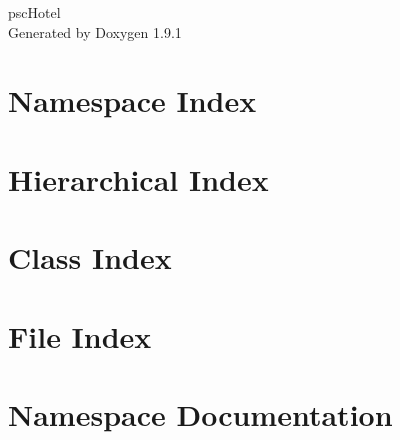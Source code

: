\let\mypdfximage\pdfximage\def\pdfximage{\immediate\mypdfximage}\documentclass[twoside]{book}
\newcommand{\+}{\discretionary{\mbox{\scriptsize$\hookleftarrow$}}{}{}}
\newcommand{\clearemptydoublepage}{%
  \newpage{\pagestyle{empty}\cleardoublepage}%
}
\begin{document}
\raggedbottom

\hypersetup{pageanchor=false,
             bookmarksnumbered=true,
             pdfencoding=unicode
            }
\begin{titlepage}
\vspace*{7cm}
\begin{center}%
{\Large psc\+Hotel }\\
\vspace*{1cm}
{\large Generated by Doxygen 1.9.1}\\
\end{center}
\end{titlepage}
\clearemptydoublepage
{}
\tableofcontents
\clearemptydoublepage
{}
\hypersetup{pageanchor=true}

\chapter{Namespace Index}

\chapter{Hierarchical Index}

\chapter{Class Index}

\chapter{File Index}

\chapter{Namespace Documentation}



\end{document}

